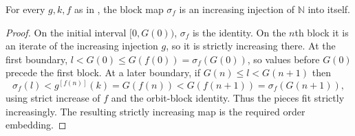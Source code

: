 \begin{lemma}
For every $g,k,f$ as in , the block map $\sigma_f$ is
an increasing injection of $\mathbb N$ into itself.
\end{lemma}
\begin{proof}
On the initial interval $[0,G(0))$, $\sigma_f$ is the identity.  On the
$n$th block it is an iterate of the increasing injection $g$, so it is
strictly increasing there.  At the first boundary,
$l<G(0)\leq G(f(0))=\sigma_f(G(0))$, so values before $G(0)$ precede the
first block.  At a later boundary, if $G(n)\leq l<G(n+1)$ then
\[
\sigma_f(l)<g^{[f(n)]}(k)=G(f(n))<G(f(n+1))
=\sigma_f(G(n+1)),
\]
using strict increase of $f$ and the orbit-block identity.  Thus the pieces
fit strictly increasingly.  The resulting strictly increasing map is the
required order embedding.
\end{proof}
